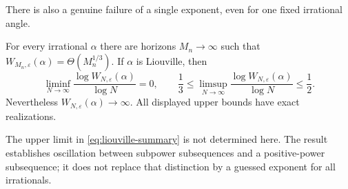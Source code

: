 There is also a genuine failure of a single exponent, even for one fixed irrational angle.
\begin{theorem}\label{thm:liouville-main}
For every irrational $\alpha$ there are horizons $M_n\to\infty$ such that
$W_{M_n,\varepsilon}(\alpha)=\Theta(M_n^{1/3})$. If $\alpha$ is Liouville, then
\begin{equation}\label{eq:liouville-summary}
 \liminf_{N\to\infty}\frac{\log W_{N,\varepsilon}(\alpha)}{\log N}=0,
 \qquad
 \frac13\le\limsup_{N\to\infty}\frac{\log W_{N,\varepsilon}(\alpha)}{\log N}
 \le\frac12.
\end{equation}
Nevertheless $W_{N,\varepsilon}(\alpha)\to\infty$. All displayed upper bounds have exact realizations.
\end{theorem}

The upper limit in \eqref{eq:liouville-summary} is not determined here. The result establishes oscillation between subpower subsequences and a positive-power subsequence; it does not replace that distinction by a guessed exponent for all irrationals.

